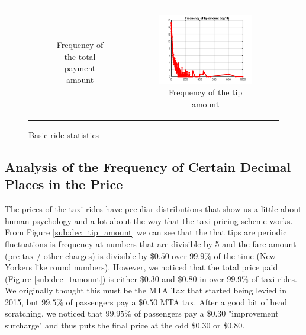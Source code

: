 \documentclass{article}
\begin{document}
\begin{figure}[H]
\begin{tabular}{cc}
\begin{subfigure}{.5\linewidth}
  \caption{Frequency of the total payment amount}
  \label{sub:tamount}%
\end{subfigure} &
\begin{subfigure}{.5\linewidth}
  \centering
  \includegraphics[width=.8\linewidth]{frequency-tipamount}
  \caption{Frequency of the tip amount}
  \label{sub:tip_amount}
\end{subfigure} \\ 

\end{tabular}

\caption{Basic ride statistics}
\label{fig:bstats}
\end{figure}


\subsection{Analysis of the Frequency of Certain Decimal Places in the Price}
The prices of the taxi rides have peculiar distributions that show us a little about human psychology and a lot about the way that the taxi pricing scheme works. From Figure \ref{sub:dec_tip_amount} we can see that the that tips are periodic fluctuations is frequency at numbers that are divisible by 5 and the fare amount (pre-tax / other charges) is divisible by \$$0.50$ over $99.9\%$ of the time  (New Yorkers like round numbers). However, we noticed that the total price paid (Figure \ref{sub:dec_tamount}) is either \$$0.30$ and \$$0.80$ in over $99.9\%$ of taxi rides. We originally thought this must be the MTA Tax that started being levied in 2015, but $99.5\%$ of passengers pay a \$$0.50$ MTA tax. After a good bit of head scratching, we noticed that $99.95\%$ of passengers pay a \$$0.30$ "improvement surcharge" and thus puts the final price at the odd \$$0.30$ or \$$0.80$.
\end{document}
